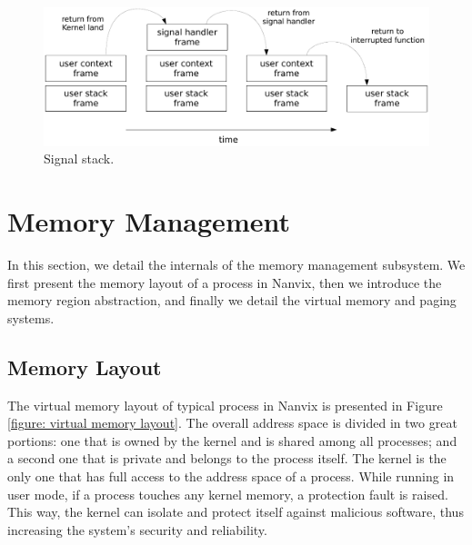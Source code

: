 \documentclass[10pt,a4paper]{article}
\begin{document}
\begin{figure}[b]
	\centering
	\includegraphics[scale=0.6]{img/signal-stack}
	\caption{Signal stack.}
	\label{figure: signal stack}
\end{figure}

\section{Memory Management}

In this section, we detail the internals of the memory management subsystem. We first present the memory layout of a process in Nanvix, then we introduce the memory region abstraction, and finally we detail the virtual memory and paging systems.

\subsection{Memory Layout}
\label{subsection: memory layout}

The virtual memory layout of typical process in Nanvix is presented in Figure \ref{figure: virtual memory layout}. The overall address space is divided in two great portions: one that is owned by the kernel and is shared among all processes; and a second one that is private and belongs to the process itself. The kernel is the only one that has full access to the address space of a process. While running in user mode, if a process touches any kernel memory, a protection fault is raised. This way, the kernel can isolate and protect itself against malicious software, thus increasing the system's security and reliability.
\end{document}
